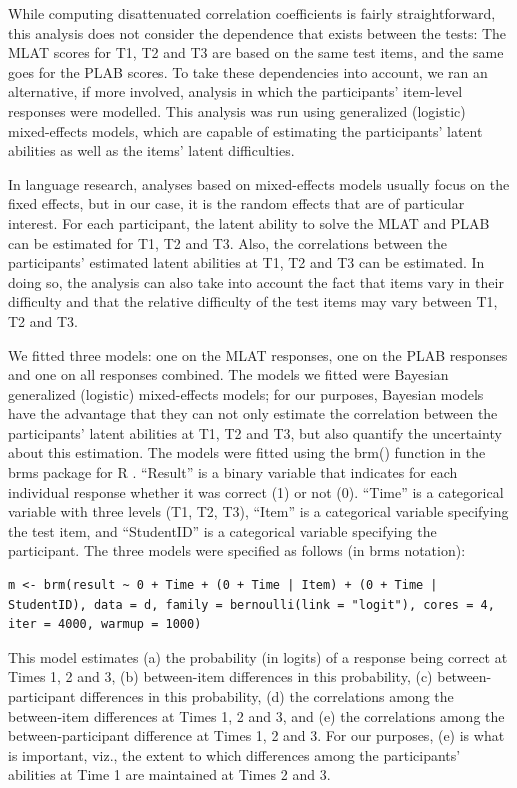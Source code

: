 \documentclass[output=paper]{langsci/langscibook}
\begin{document}
While computing disattenuated correlation coefficients is fairly straightforward, this analysis does not consider the dependence that exists between the tests: The MLAT scores for T1, T2 and T3 are based on the same test items, and the same goes for the PLAB scores. To take these dependencies into account, we ran an alternative, if more involved, analysis in which the participants’ item-level responses were modelled. This analysis was run using generalized (logistic) mixed-effects models, which are capable of estimating the participants’ latent abilities as well as the items’ latent difficulties.

In language research, analyses based on mixed-effects models usually focus on the fixed effects, but in our case, it is the random effects that are of particular interest. For each participant, the latent ability to solve the MLAT and PLAB can be estimated for T1, T2 and T3. Also, the correlations between the participants’ estimated latent abilities at T1, T2 and T3 can be estimated. In doing so, the analysis can also take into account the fact that items vary in their difficulty and that the relative difficulty of the test items may vary between T1, T2 and T3. 

We fitted three models: one on the MLAT responses, one on the PLAB responses and one on all responses combined. The models we fitted were Bayesian generalized (logistic) mixed-effects models; for our purposes, Bayesian models have the advantage that they can not only estimate the correlation between the participants’ latent abilities at T1, T2 and T3, but also quantify the uncertainty about this estimation. The models were fitted using the brm() function in the brms package for R \citep{Buerkner2017}. ``Result'' is a binary variable that indicates for each individual response whether it was correct (1) or not (0). ``Time'' is a categorical variable with three levels (T1, T2, T3), ``Item'' is a categorical variable specifying the test item, and ``StudentID'' is a categorical variable specifying the participant. The three models were specified as follows (in brms notation):

\begin{lstlisting}
m <- brm(result ~ 0 + Time + (0 + Time | Item) + (0 + Time | StudentID), data = d, family = bernoulli(link = "logit"), cores = 4, iter = 4000, warmup = 1000)
\end{lstlisting}

This model estimates (a) the probability (in logits) of a response being correct at Times 1, 2 and 3, (b) between-item differences in this probability, (c) between-participant differences in this probability, (d) the correlations among the between-item differences at Times 1, 2 and 3, and (e) the correlations among the between-participant difference at Times 1, 2 and 3. For our purposes, (e) is what is important, viz., the extent to which differences among the participants’ abilities at Time 1 are maintained at Times 2 and 3.
\end{document}
